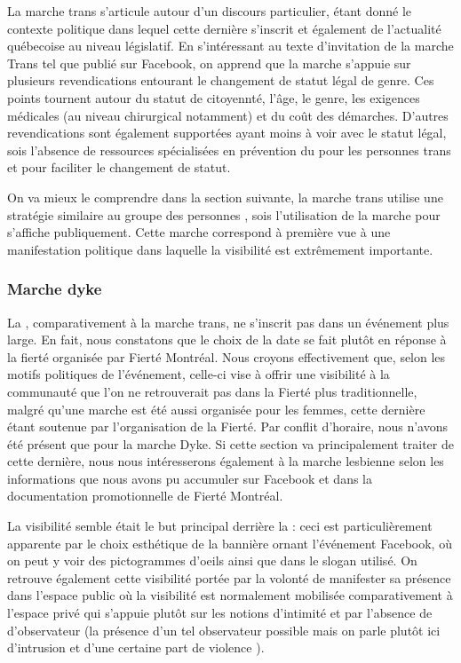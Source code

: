 La marche trans s'articule autour d'un discours particulier, étant donné le contexte politique dans lequel cette dernière s'inscrit et également de l'actualité québecoise au niveau législatif. 
En s'intéressant au texte d'invitation de la marche Trans tel que publié sur Facebook, on apprend que la marche s'appuie sur plusieurs revendications entourant le changement de statut légal de genre. 
Ces points tournent autour du statut de citoyennté, l'âge, le genre, les exigences médicales (au niveau chirurgical notamment) et du coût des démarches. 
D'autres revendications sont également supportées ayant moins à voir avec le statut légal, sois l'absence de ressources spécialisées en prévention du \vih{} pour les personnes trans et pour faciliter le changement de statut.

On va mieux le comprendre dans la section suivante, la marche trans utilise une stratégie similaire au groupe des personnes \dyke{}, sois l'utilisation de la marche pour s'affiche publiquement. 
Cette marche correspond à première vue à une manifestation politique dans laquelle la visibilité est extrêmement importante.

\subsubsection{Marche dyke}
\label{subsubsec:marchedyke}
La \dm{}, comparativement à la marche trans, ne s'inscrit pas dans un événement plus large. 
En fait, nous constatons que le choix de la date se fait plutôt en réponse à la fierté organisée par Fierté Montréal. 
Nous croyons effectivement que, selon les motifs politiques de l'événement, celle-ci vise à offrir une visibilité à la communauté \dyke{} que l'on ne retrouverait pas dans la Fierté plus traditionnelle, malgré qu'une marche est été aussi organisée pour les femmes, cette dernière étant soutenue par l'organisation de la Fierté. 
Par conflit d'horaire, nous n'avons été présent que pour la marche Dyke. 
Si cette section va principalement traiter de cette dernière, nous nous intéresserons également à la marche lesbienne selon les informations que nous avons pu accumuler sur Facebook et dans la documentation promotionnelle de Fierté Montréal.

La visibilité semble était le but principal derrière la \dm{}: ceci est particulièrement apparente par le choix esthétique de la bannière ornant l'événement Facebook, où on peut y voir des pictogrammes d'oeils ainsi que dans le slogan utilisé. 
On retrouve également cette visibilité portée par la volonté de manifester sa présence dans l'espace public où la visibilité est normalement mobilisée comparativement à l'espace privé qui s'appuie plutôt sur les notions d'intimité et par l'absence de d'observateur (la présence d'un tel observateur possible mais on parle plutôt ici d'intrusion et d'une certaine part de violence ). 


